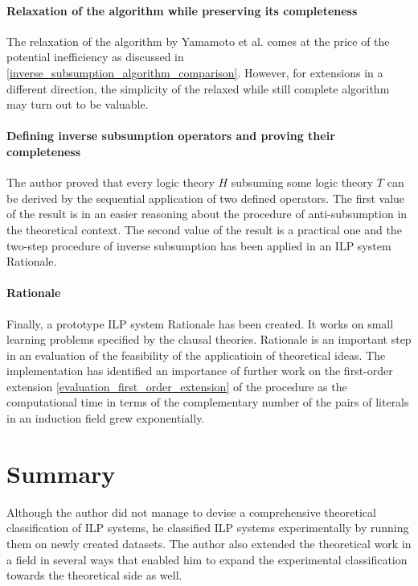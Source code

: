 \paragraph{Relaxation of the algorithm while preserving its completeness}
The relaxation of the algorithm by Yamamoto et al. comes at the price of the potential inefficiency as discussed in \ref{inverse_subsumption_algorithm_comparison}. However, for extensions in a different direction, the simplicity of the relaxed while still complete algorithm may turn out to be valuable.

\paragraph{Defining inverse subsumption operators and proving their completeness}
The author proved that every logic theory $H$ subsuming some logic theory $T$ can be derived by the sequential application of two defined operators. The first value of the result is in an easier reasoning about the procedure of anti-subsumption in the theoretical context. The second value of the result is a practical one and the two-step procedure of inverse subsumption has been applied in an ILP system Rationale.

\paragraph{Rationale} Finally, a prototype ILP system Rationale has been created. It works on small learning problems specified by the clausal theories. Rationale is an important step in an evaluation of the feasibility of the applicatioin of theoretical ideas. The implementation has identified an importance of further work on the first-order extension \ref{evaluation_first_order_extension} of the procedure as the computational time in terms of the complementary number of the pairs of literals in an induction field grew exponentially.

\section{Summary}
Although the author did not manage to devise a comprehensive theoretical classification of ILP systems, he classified ILP systems experimentally by running them on newly created datasets. The author also extended the theoretical work in a field in several ways that enabled him to expand the experimental classification towards the theoretical side as well.